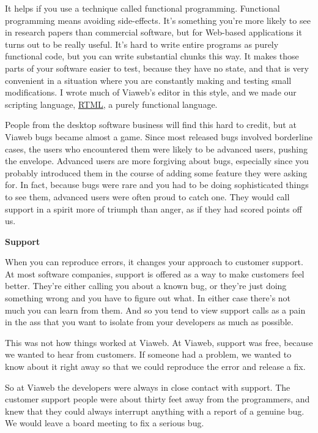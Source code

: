 It helps if you use a technique called functional programming.
Functional programming means avoiding side-effects. It's something
you're more likely to see in research papers than commercial software,
but for Web-based applications it turns out to be really useful. It's
hard to write entire programs as purely functional code, but you can
write substantial chunks this way. It makes those parts of your software
easier to test, because they have no state, and that is very convenient
in a situation where you are constantly making and testing small
modifications. I wrote much of Viaweb's editor in this style, and we
made our scripting language,
\href{http://store.yahoo.com/rtml.html}{RTML}, a purely functional
language.

People from the desktop software business will find this hard to credit,
but at Viaweb bugs became almost a game. Since most released bugs
involved borderline cases, the users who encountered them were likely to
be advanced users, pushing the envelope. Advanced users are more
forgiving about bugs, especially since you probably introduced them in
the course of adding some feature they were asking for. In fact, because
bugs were rare and you had to be doing sophisticated things to see them,
advanced users were often proud to catch one. They would call support in
a spirit more of triumph than anger, as if they had scored points off
us.

\textbf{Support}

When you can reproduce errors, it changes your approach to customer
support. At most software companies, support is offered as a way to make
customers feel better. They're either calling you about a known bug, or
they're just doing something wrong and you have to figure out what. In
either case there's not much you can learn from them. And so you tend to
view support calls as a pain in the ass that you want to isolate from
your developers as much as possible.

This was not how things worked at Viaweb. At Viaweb, support was free,
because we wanted to hear from customers. If someone had a problem, we
wanted to know about it right away so that we could reproduce the error
and release a fix.

So at Viaweb the developers were always in close contact with support.
The customer support people were about thirty feet away from the
programmers, and knew that they could always interrupt anything with a
report of a genuine bug. We would leave a board meeting to fix a serious
bug.


